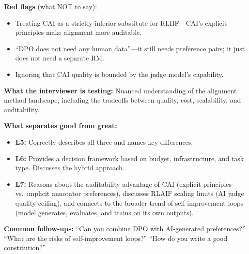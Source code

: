 \begin{interviewq}
\textbf{Red flags} (what NOT to say):
\begin{itemize}
    \item Treating CAI as a strictly inferior substitute for RLHF---CAI's explicit principles make alignment more auditable.
    \item ``DPO does not need any human data''---it still needs preference pairs; it just does not need a separate RM.
    \item Ignoring that CAI quality is bounded by the judge model's capability.
\end{itemize}

\textbf{What the interviewer is testing:} Nuanced understanding of the alignment method landscape, including the tradeoffs between quality, cost, scalability, and auditability.

\textbf{What separates good from great:}
\begin{itemize}
    \item \textbf{L5:} Correctly describes all three and names key differences.
    \item \textbf{L6:} Provides a decision framework based on budget, infrastructure, and task type. Discusses the hybrid approach.
    \item \textbf{L7:} Reasons about the auditability advantage of CAI (explicit principles vs.\ implicit annotator preferences), discusses RLAIF scaling limits (AI judge quality ceiling), and connects to the broader trend of self-improvement loops (model generates, evaluates, and trains on its own outputs).
\end{itemize}

\textbf{Common follow-ups:} ``Can you combine DPO with AI-generated preferences?'' ``What are the risks of self-improvement loops?'' ``How do you write a good constitution?''
\end{interviewq}


